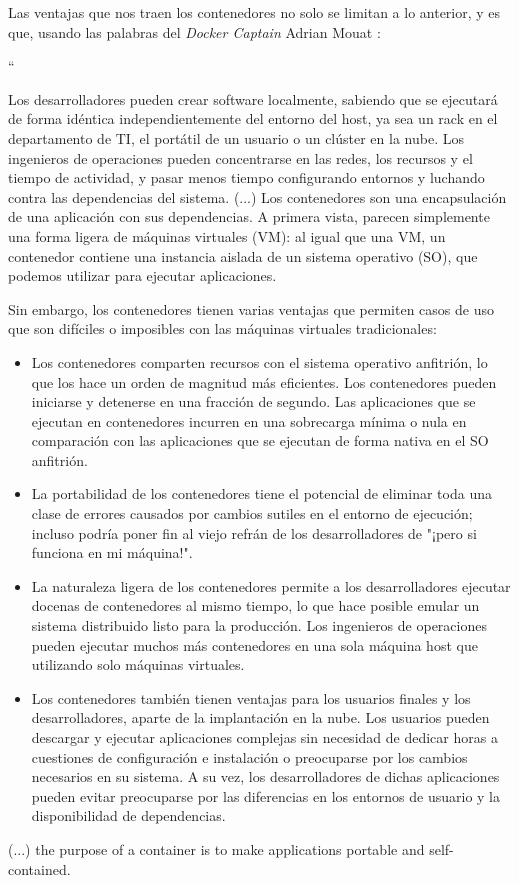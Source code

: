 Las ventajas que nos traen los contenedores no solo se limitan a lo anterior, y es que, usando las palabras del \textit{Docker Captain} Adrian Mouat \cite{dockerAdrianMouat}:


``

Los desarrolladores pueden crear software localmente, sabiendo que se ejecutará de forma idéntica independientemente del entorno del host, ya sea un rack en el departamento de TI, el portátil de un usuario o un clúster en la nube. Los ingenieros de operaciones pueden concentrarse en las redes, los recursos y el tiempo de actividad, y pasar menos tiempo configurando entornos y luchando contra las dependencias del sistema. 
(...)
Los contenedores son una encapsulación de una aplicación con sus dependencias. A primera vista, parecen simplemente una forma ligera de máquinas virtuales (VM): al igual que una VM, un contenedor contiene una instancia aislada de un sistema operativo (SO), que podemos utilizar para ejecutar aplicaciones.

Sin embargo, los contenedores tienen varias ventajas que permiten casos de uso que son difíciles o imposibles con las máquinas virtuales tradicionales:
\begin{itemize}
    \item Los contenedores comparten recursos con el sistema operativo anfitrión, lo que los hace un orden de magnitud más eficientes. Los contenedores pueden iniciarse y detenerse en una fracción de segundo. Las aplicaciones que se ejecutan en contenedores incurren en una sobrecarga mínima o nula en comparación con las aplicaciones que se ejecutan de forma nativa en el SO anfitrión.
    \item La portabilidad de los contenedores tiene el potencial de eliminar toda una clase de errores causados por cambios sutiles en el entorno de ejecución; incluso podría poner fin al viejo refrán de los desarrolladores de "¡pero si funciona en mi máquina!".
    \item La naturaleza ligera de los contenedores permite a los desarrolladores ejecutar docenas de contenedores al mismo tiempo, lo que hace posible emular un sistema distribuido listo para la producción. Los ingenieros de operaciones pueden ejecutar muchos más contenedores en una sola máquina host que utilizando solo máquinas virtuales.
    \item Los contenedores también tienen ventajas para los usuarios finales y los desarrolladores, aparte de la implantación en la nube. Los usuarios pueden descargar y ejecutar aplicaciones complejas sin necesidad de dedicar horas a cuestiones de configuración e instalación o preocuparse por los cambios necesarios en su sistema. A su vez, los desarrolladores de dichas aplicaciones pueden evitar preocuparse por las diferencias en los entornos de usuario y la disponibilidad de dependencias.
\end{itemize}
(...) the purpose of a container is to make applications portable and self-contained.

